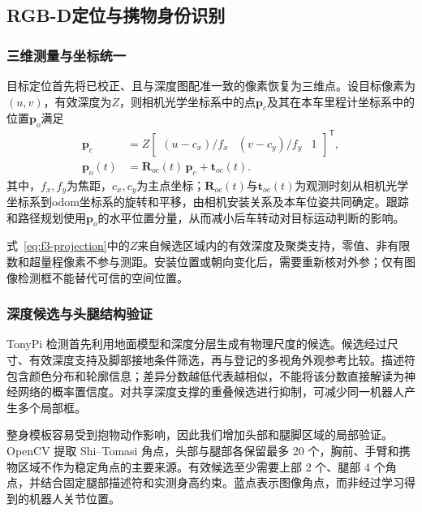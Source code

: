 \FloatBarrier
{}
\subsection{RGB-D定位与携物身份识别}\label{sec:f3-perception}
\subsubsection{三维测量与坐标统一}
目标定位首先将已校正、且与深度图配准一致的像素恢复为三维点。设目标像素为$(u,v)$，有效深度为$Z$，则相机光学坐标系中的点$\mathbf p_c$及其在本车里程计坐标系中的位置$\mathbf p_o$满足
\begin{equation}\label{eq:f3-projection}
\begin{aligned}
\mathbf p_c & = Z
\begin{bmatrix}
(u-c_x)/f_x & (v-c_y)/f_y & 1
\end{bmatrix}^{\mathsf T},\\
\mathbf p_o(t) & = \mathbf R_{oc}(t)\,\mathbf p_c+\mathbf t_{oc}(t).
\end{aligned}
\end{equation}
其中，$f_x,f_y$为焦距，$c_x,c_y$为主点坐标；$\mathbf R_{oc}(t)$与$\mathbf t_{oc}(t)$为观测时刻从相机光学坐标系到odom坐标系的旋转和平移，由相机安装关系及本车位姿共同确定。跟踪和路径规划使用$\mathbf p_o$的水平位置分量，从而减小后车转动对目标运动判断的影响。

式~\eqref{eq:f3-projection}中的$Z$来自候选区域内的有效深度及聚类支持，零值、非有限数和超量程像素不参与测距。安装位置或朝向变化后，需要重新核对外参；仅有图像检测框不能替代可信的空间位置。

\subsubsection{深度候选与头腿结构验证}
TonyPi 检测首先利用地面模型和深度分层生成有物理尺度的候选。候选经过尺寸、有效深度支持及脚部接地条件筛选，再与登记的多视角外观参考比较。描述符包含颜色分布和轮廓信息；差异分数越低代表越相似，不能将该分数直接解读为神经网络的概率置信度。对共享深度支撑的重叠候选进行抑制，可减少同一机器人产生多个局部框。

整身模板容易受到抱物动作影响，因此我们增加头部和腿脚区域的局部验证。OpenCV  提取 Shi--Tomasi 角点，头部与腿部各保留最多 20 个，胸前、手臂和携物区域不作为稳定角点的主要来源。有效候选至少需要上部 2 个、腿部 4 个角点，并结合固定腿部描述符和实测身高约束。蓝点表示图像角点，而非经过学习得到的机器人关节位置。

